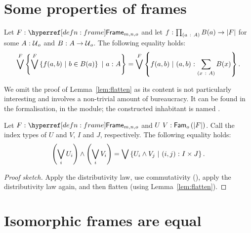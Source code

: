 \section{Some properties of frames}

\begin{lemma}\label{lem:flatten}
  Let $\oftyI{F}{\framety{m}{n}{o}}$ and let $f\hspace{0.1mm}:\hspace{0.1mm}\prod_{(a~:~A)} B(a) \rightarrow \left| F \right|$ for
  some $A\hspace{0.1mm}:\hspace{0.1mm}\mathcal{U}{}_o$ and $B\hspace{0.1mm}:\hspace{0.1mm}A \rightarrow \mathcal{U}{}_o$. The following equality
  holds:
  \begin{equation*}
      \bigvee^F \left\{  \bigvee^F \left\{  f(a, b) ~|~ b \in B(a)  \right\} ~|~ a\hspace{0.1mm}:\hspace{0.1mm}A           \right\}
    = \bigvee^F \left\{  f(a, b)             ~|~ (a, b)\hspace{0.1mm}:\hspace{0.1mm}\sum_{(x~:~A)} B(x)  \right\}.
  \end{equation*}
\end{lemma}

We omit the proof of Lemma~\ref{lem:flatten} as its content is not particularly
interesting and involves a non-trivial amount of bureaucracy. It can be found in the
\veragda{} formalisation, in the  module; the constructed inhabitant is
named .

\begin{prop}\label{prop:distr}
  Let $\oftyI{F}{\framety{m}{n}{o}}$ and $U~V:\mathsf{Fam}_{o}\left(\left| F \right|\right)$. Call the index
  types of $U$ and $V$, $I$ and $J$, respectively. The following equality holds:
  \begin{equation*}
      \left( \bigvee_i U_i \right) \wedge \left( \bigvee_i V_i \right)
    = \bigvee \left\{  U_i \wedge V_j ~|~ (i, j)\hspace{0.1mm}:\hspace{0.1mm}I \times J  \right\}.
  \end{equation*}
\end{prop}
\begin{proof}[Proof sketch]
  Apply the distributivity law, use commutativity (), apply the
  distributivity law again, and then flatten (using Lemma~\ref{lem:flatten}).
\end{proof}

\section{Isomorphic frames are equal}\label{sec:frame-univ}


